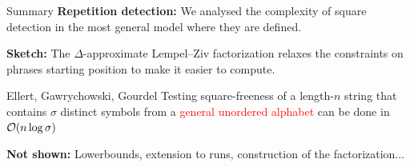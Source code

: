 \begin{frame}{Summary}
    \textbf{Repetition detection:} We analysed the complexity of square detection in the most general model where they are defined.
    \vfill
    
    \textbf{Sketch:} The $\Delta$-approximate Lempel--Ziv factorization relaxes the constraints on phrases starting position to make it easier to compute.
    \vfill
    \begin{myalertblock}{Ellert, Gawrychowski, Gourdel}
        Testing square-freeness of a length-$n$ string  that contains $\sigma$ distinct symbols from a \textcolor{red}{general unordered alphabet} can be done in $\mathcal{O}(n \log \sigma)$
    \end{myalertblock}
    \vfill
    \textbf{Not shown:} Lowerbounds, extension to runs, construction of the factorization...
\end{frame}
    